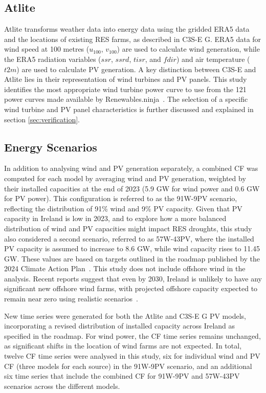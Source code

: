 \documentclass[a4paper, 11p1t]{article}
\begin{document}
\subsection{Atlite} 
\label{sec:atlite}

Atlite transforms weather data into energy data using the gridded ERA5 data and the locations of existing RES farms, as described in C3S-E G. ERA5 data for wind speed at 100 metres ($u_{100}$, $v_{100}$) are used to calculate wind generation, while the ERA5 radiation variables ($ssr$, $ssrd$, $tisr$, and $fdir$) and air temperature ($t2m$) are used to calculate PV generation. A key distinction between C3S-E and Atlite lies in their representation of wind turbines and PV panels. This study identifies the most appropriate wind turbine power curve to use from the 121 power curves made available by Renewables.ninja~\cite{staffell2016wake}. The selection of a specific wind turbine and PV panel characteristics is further discussed and explained in section \ref{sec:verification}.

\subsection{Energy Scenarios}
\label{sec:scenarios}

In addition to analysing wind and PV generation separately, a combined CF was computed for each model by averaging wind and PV generation, weighted by their installed capacities at the end of 2023 (5.9 GW for wind power and 0.6 GW for PV power). This configuration is referred to as the 91W-9PV scenario, reflecting the distribution of 91\% wind and 9\% PV capacity. Given that PV capacity in Ireland is low in 2023, and to explore how a more balanced distribution of wind and PV capacities might impact RES droughts, this study also considered a second scenario, referred to as 57W-43PV, where the installed PV capacity is assumed to increase to 8.6 GW, while wind capacity rises to 11.45 GW. These values are based on targets outlined in the roadmap published by the 2024 Climate Action Plan~\cite{cap2024future}. This study does not include offshore wind in the analysis. Recent reports suggest that even by 2030, Ireland is unlikely to have any significant new offshore wind farms, with projected offshore capacity expected to remain near zero using realistic scenarios~\cite{seai2024future}.

New time series were generated for both the Atlite and C3S-E G PV models, incorporating a revised distribution of installed capacity across Ireland as specified in the roadmap. For wind power, the CF time series remains unchanged, as significant shifts in the location of wind farms are not expected. In total, twelve CF time series were analysed in this study, six for individual wind and PV CF (three models for each source) in the 91W-9PV scenario, and an additional six time series that include the combined CF for 91W-9PV and 57W-43PV scenarios across the different models.
\end{document}
